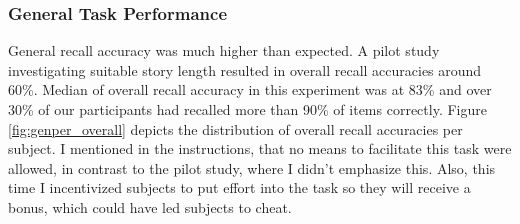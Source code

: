 \documentclass[a4paper,man,natbib,floatsintext,import]{apa6}
\begin{document}
\subsubsection{General Task Performance}
General recall accuracy was much higher than expected. A pilot study investigating suitable story length resulted in overall recall accuracies around 60\%. Median of overall recall accuracy in this experiment was at 83\% and over 30\% of our participants had recalled more than 90\% of items correctly. Figure \ref{fig:genper_overall} depicts the distribution of overall recall accuracies per subject. I mentioned in the instructions, that no means to facilitate this task were allowed, in contrast to the pilot study, where I didn't emphasize this. Also, this time I incentivized subjects to put effort into the task so they will receive a bonus, which could have led subjects to cheat.
\end{document}
